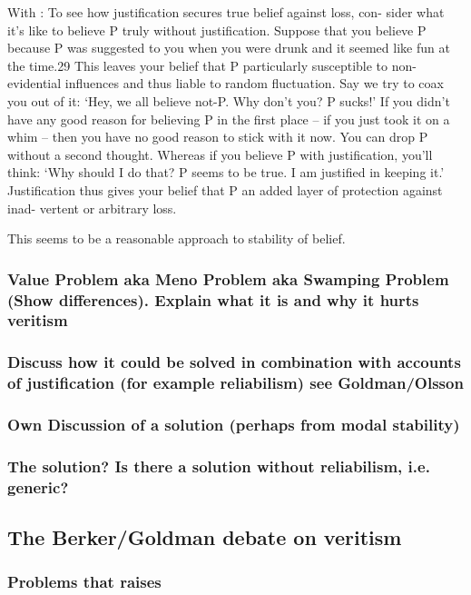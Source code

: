 \documentclass[12pt,numbers=noenddot]{scrartcl}
\begin{document}
With \textcite{Stapleford2016}:
To see how justification secures true belief against loss, con- sider what it’s like to believe P truly without justification. Suppose that you believe P because P was suggested to you when you were drunk and it seemed like fun at the time.29 This leaves your belief that P particularly susceptible to non-evidential influences and thus liable to random fluctuation. Say we try to coax you out of it: ‘Hey, we all believe not-P. Why don’t you? P sucks!’ If you didn’t have any good reason for believing P in the first place – if you just took it on a whim – then you have no good reason to stick with it now. You can drop P without a second thought. Whereas if you believe P with justification, you’ll think: ‘Why should I do that? P seems to be true. I am justified in keeping it.’ Justification thus gives your belief that P an added layer of protection against inad- vertent or arbitrary loss.

This seems to be a reasonable approach to stability of belief.


\subsubsection{ Value Problem aka Meno Problem aka Swamping Problem (Show differences). Explain what it is and why it hurts veritism }
\subsubsection{ Discuss how it could be solved in combination with accounts of justification (for example reliabilism) see Goldman/Olsson}
\subsubsection{ Own Discussion of a solution (perhaps from modal stability)}
\subsubsection{ The solution? Is there a solution without reliabilism, i.e. generic?}


\subsection{The Berker/Goldman debate on veritism}

\subsubsection{ Problems that \textcite{Berker2013-BERETA-2} raises}
\end{document}
